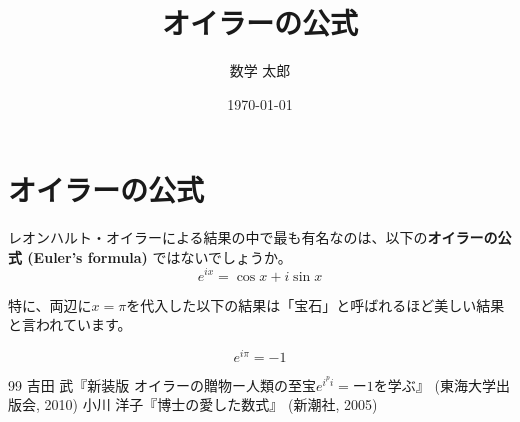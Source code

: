\documentclass{ltjsarticle}
\title{オイラーの公式}
\author{数学 太郎}
\date{\today}
\begin{document}
\section{オイラーの公式}
レオンハルト・オイラーによる結果の中で最も有名なのは、以下の\textbf{オイラーの公式 (Euler's formula) }ではないでしょうか。
\[ e^{ix} = \cos{x} + i\sin{x} \]

特に、両辺に$x=\pi$を代入した以下の結果は「宝石」と呼ばれるほど美しい結果と言われています。

\[ e^{i\pi} = -1 \]

\begin{thebibliography}{99}
 吉田 武『新装版 オイラーの贈物ー人類の至宝$e^{i^pi}=ー1$を学ぶ』 (東海大学出版会, 2010)
 小川 洋子『博士の愛した数式』 (新潮社, 2005)
\end{thebibliography}
\end{document}
